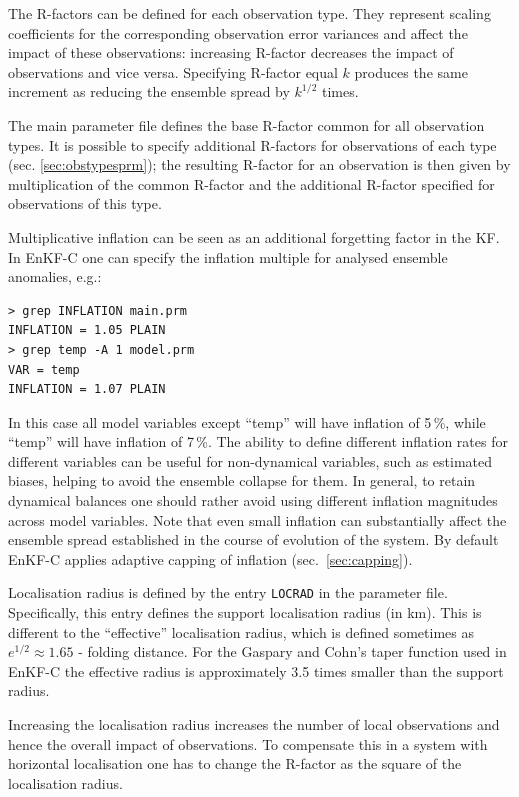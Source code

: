 \documentclass[11pt]{report}
\begin{document}
The R-factors can be defined for each observation type.
They represent scaling coefficients for the corresponding observation error variances and affect the impact of these observations: increasing R-factor decreases the impact of observations and vice versa.
Specifying R-factor equal $k$ produces the same increment as reducing the ensemble spread by $k^{1/2}$ times.

The main parameter file defines the base R-factor common for all observation types.
It is possible to specify additional R-factors for observations of each type (sec. \ref{sec:obstypesprm}); the resulting R-factor for an observation is then given by multiplication of the common R-factor and the additional R-factor specified for observations of this type.

Multiplicative inflation can be seen as an additional forgetting factor in the KF.
In EnKF-C one can specify the inflation multiple for analysed ensemble anomalies, e.g.:
\begin{Verbatim}[frame=single,fontsize=\footnotesize]
> grep INFLATION main.prm
INFLATION = 1.05 PLAIN
> grep temp -A 1 model.prm
VAR = temp
INFLATION = 1.07 PLAIN
\end{Verbatim}
In this case all model variables except ``temp'' will have inflation of 5\,\%, while ``temp'' will have inflation of 7\,\%.
The ability to define different inflation rates for different variables can be useful for non-dynamical variables, such as estimated biases, helping to avoid the ensemble collapse for them.
In general, to retain dynamical balances one should rather avoid using different inflation magnitudes across model variables.
Note that even small inflation can substantially affect the ensemble spread established in the course of evolution of the system.
By default EnKF-C applies adaptive capping of inflation (sec.~\ref{sec:capping}).

Localisation radius is defined by the entry \verb|LOCRAD| in the parameter file.
Specifically, this entry defines the support localisation radius (in km).
This is different to the ``effective'' localisation radius, which is defined sometimes as $e^{1/2}\approx 1.65$ - folding distance.
For the Gaspary and Cohn's taper function used in EnKF-C the effective radius is approximately 3.5 times smaller than the support radius.

Increasing the localisation radius increases the number of local observations and hence the overall impact of observations.
To compensate this in a system with horizontal localisation one has to change the R-factor as the square of the localisation radius.
\end{document}

